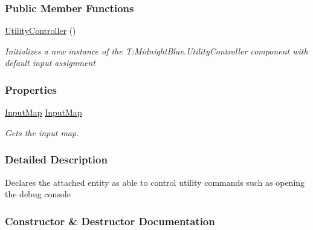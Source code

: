 \subsubsection*{Public Member Functions}
\begin{DoxyCompactItemize}
\item 
\hyperlink{class_m_b2_d_1_1_entity_component_1_1_utility_controller_a161534f361fd2f0f734fb27c58c50cf9}{Utility\+Controller} ()
\begin{DoxyCompactList}\small\item\em Initializes a new instance of the T\+:\+Midnight\+Blue.\+Utility\+Controller component with default input assignment \end{DoxyCompactList}\end{DoxyCompactItemize}
\subsubsection*{Properties}
\begin{DoxyCompactItemize}
\item 
\hyperlink{class_m_b2_d_1_1_i_o_1_1_input_map}{Input\+Map} \hyperlink{class_m_b2_d_1_1_entity_component_1_1_utility_controller_a33211d8d414f44a6c320db8f73623882}{Input\+Map}
\begin{DoxyCompactList}\small\item\em Gets the input map. \end{DoxyCompactList}\end{DoxyCompactItemize}


\subsubsection{Detailed Description}
Declares the attached entity as able to control utility commands such as opening the debug console 



\subsubsection{Constructor \& Destructor Documentation}
\hypertarget{class_m_b2_d_1_1_entity_component_1_1_utility_controller_a161534f361fd2f0f734fb27c58c50cf9}{}\label{class_m_b2_d_1_1_entity_component_1_1_utility_controller_a161534f361fd2f0f734fb27c58c50cf9} 
